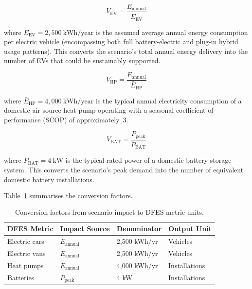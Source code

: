 \begin{equation}
\label{eq:ev-conversion}
V_{\text{EV}} = \frac{E_{\text{annual}}}{\bar{E}_{\text{EV}}}
\end{equation}

\noindent where $\bar{E}_{\text{EV}} = 2{,}500~\text{kWh/year}$ is the assumed average annual energy consumption per electric vehicle (encompassing both full battery-electric and plug-in hybrid usage patterns). This converts the scenario's total annual energy delivery into the number of EVs that could be sustainably supported.

\begin{equation}
\label{eq:hp-conversion}
V_{\text{HP}} = \frac{E_{\text{annual}}}{\bar{E}_{\text{HP}}}
\end{equation}

\noindent where $\bar{E}_{\text{HP}} = 4{,}000~\text{kWh/year}$ is the typical annual electricity consumption of a domestic air-source heat pump operating with a seasonal coefficient of performance (SCOP) of approximately~3.

\begin{equation}
\label{eq:bat-conversion}
V_{\text{BAT}} = \frac{P_{\text{peak}}}{\bar{P}_{\text{BAT}}}
\end{equation}

\noindent where $\bar{P}_{\text{BAT}} = 4~\text{kW}$ is the typical rated power of a domestic battery storage system. This converts the scenario's peak demand into the number of equivalent domestic battery installations.

Table~\ref{tab:metric-conversion} summarises the conversion factors.

\begin{table}[htbp]
\centering
\caption{Conversion factors from scenario impact to DFES metric units.}
\label{tab:metric-conversion}
\small
\begin{tabular}{llll}
\toprule
\textbf{DFES Metric} & \textbf{Impact Source} & \textbf{Denominator} & \textbf{Output Unit} \\
\midrule
Electric cars & $E_{\text{annual}}$ & 2{,}500 kWh/yr & Vehicles \\
Electric vans & $E_{\text{annual}}$ & 2{,}500 kWh/yr & Vehicles \\
Heat pumps & $E_{\text{annual}}$ & 4{,}000 kWh/yr & Installations \\
Batteries & $P_{\text{peak}}$ & 4 kW & Installations \\
\bottomrule
\end{tabular}
\end{table}

